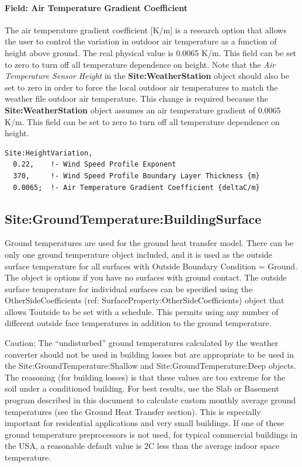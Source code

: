 \paragraph{Field: Air Temperature Gradient Coefficient}\label{field-air-temperature-gradient-coefficient}

The air temperature gradient coefficient {[}K/m{]} is a research option that allows the user to control the variation in outdoor air temperature as a function of height above ground. The real physical value is 0.0065 K/m. This field can be set to zero to turn off all temperature dependence on height. Note that the \emph{Air Temperature Sensor Height} in the \textbf{Site:WeatherStation} object should also be set to zero in order to force the local outdoor air temperatures to match the weather file outdoor air temperature. This change is required because the \textbf{Site:WeatherStation} object assumes an air temperature gradient of 0.0065 K/m. This field can be set to zero to turn off all temperature dependence on height.

\begin{lstlisting}
Site:HeightVariation,
  0.22,    !- Wind Speed Profile Exponent
  370,     !- Wind Speed Profile Boundary Layer Thickness {m}
  0.0065;  !- Air Temperature Gradient Coefficient {deltaC/m}
\end{lstlisting}

\subsection{Site:GroundTemperature:BuildingSurface}\label{sitegroundtemperaturebuildingsurface}

Ground temperatures are used for the ground heat transfer model. There can be only one ground temperature object included, and it is used as the outside surface temperature for all surfaces with Outside Boundary Condition = Ground. The object is options if you have no surfaces with ground contact. The outside surface temperature for individual surfaces can be specified using the OtherSideCoefficients (ref: SurfaceProperty:OtherSideCoefficients) object that allows Toutside to be set with a schedule. This permits using any number of different outside face temperatures in addition to the ground temperature.

\begin{callout}
Caution: The ``undisturbed'' ground temperatures calculated by the weather converter should not be used in building losses but are appropriate to be used in the Site:GroundTemperature:Shallow and Site:GroundTemperature:Deep objects. The reasoning (for building losses) is that these values are too extreme for the soil under a conditioned building. For best results, use the Slab or Basement program described in this document to calculate custom monthly average ground temperatures (see the Ground Heat Transfer section). This is especially important for residential applications and very small buildings. If one of these ground temperature preprocessors is not used, for typical commercial buildings in the USA, a reasonable default value is 2C less than the average indoor space temperature.
\end{callout}

